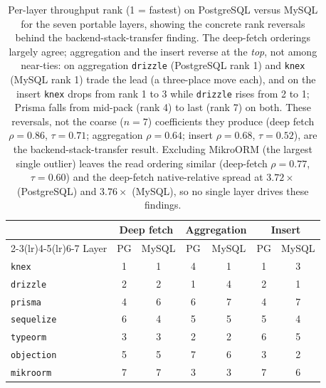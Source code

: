 \begin{table}[htbp]
  \centering
  \caption{Per-layer throughput rank (1 = fastest) on PostgreSQL versus MySQL for the
    seven portable layers, showing the concrete rank reversals behind the
    backend-stack-transfer finding. The deep-fetch orderings largely agree; aggregation
    and the insert reverse at the \emph{top}, not among near-ties: on aggregation
    \texttt{drizzle} (PostgreSQL rank 1) and \texttt{knex} (MySQL rank 1) trade the lead
    (a three-place move each), and on the insert \texttt{knex} drops from rank 1 to 3
    while \texttt{drizzle} rises from 2 to 1; Prisma falls from mid-pack (rank 4) to last
    (rank 7) on both. These reversals, not the coarse ($n=7$) coefficients they produce
    (deep fetch $\rho=0.86$, $\tau=0.71$; aggregation $\rho=0.64$; insert $\rho=0.68$,
    $\tau=0.52$), are the backend-stack-transfer result. Excluding
    MikroORM (the largest single outlier) leaves the read ordering similar (deep-fetch
    $\rho=0.77$, $\tau=0.60$) and the deep-fetch native-relative spread at $3.72\times$
    (PostgreSQL) and $3.76\times$ (MySQL), so no single layer drives these findings.}
  \label{tab:ranks}
  \begin{tabular}{l cc cc cc}
    \toprule
    & \multicolumn{2}{c}{Deep fetch} & \multicolumn{2}{c}{Aggregation} & \multicolumn{2}{c}{Insert} \\
    \cmidrule(lr){2-3}\cmidrule(lr){4-5}\cmidrule(lr){6-7}
    Layer & PG & MySQL & PG & MySQL & PG & MySQL \\
    \midrule
    \texttt{knex}      & 1 & 1 & 4 & 1 & 1 & 3 \\
    \texttt{drizzle}   & 2 & 2 & 1 & 4 & 2 & 1 \\
    \texttt{prisma}    & 4 & 6 & 6 & 7 & 4 & 7 \\
    \texttt{sequelize} & 6 & 4 & 5 & 5 & 5 & 4 \\
    \texttt{typeorm}   & 3 & 3 & 2 & 2 & 6 & 5 \\
    \texttt{objection} & 5 & 5 & 7 & 6 & 3 & 2 \\
    \texttt{mikroorm}  & 7 & 7 & 3 & 3 & 7 & 6 \\
    \bottomrule
  \end{tabular}
\end{table}
